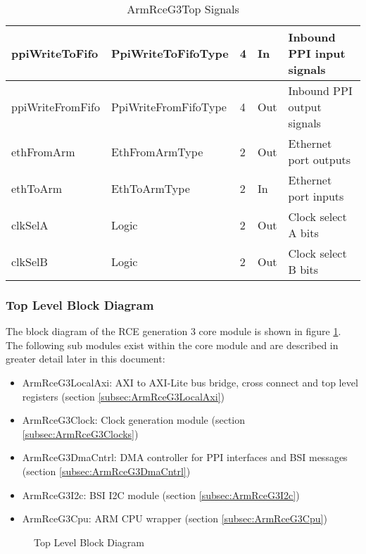 \documentclass[11pt]{article}
\begin{document}
\begin{table}[H]
\begin{tabular}{| l | l | l | l | l | }
      \hline ppiWriteToFifo     & PpiWriteToFifoType  & 4      & In        & Inbound PPI input signals \\
      \hline ppiWriteFromFifo   & PpiWriteFromFifoType  & 4      & Out       & Inbound PPI output signals \\
      \hline ethFromArm        & EthFromArmType     & 2      & Out       & Ethernet port outputs \\
      \hline ethToArm          & EthToArmType             & 2      & In        & Ethernet port inputs  \\
      \hline clkSelA           & Logic                                                    & 2      & Out       & Clock select A bits   \\
      \hline clkSelB           & Logic                                                    & 2      & Out       & Clock select B bits   \\
      \hline
   \end{tabular}
   \caption{ArmRceG3Top Signals}
   \label{tab:top_signals}
\end{table}

\subsubsection{Top Level Block Diagram}

The block diagram of the RCE generation 3 core module is shown in figure \ref{fig:top_level_block}. The following sub modules
exist within the core module and are described in greater detail later in this document:

\begin{itemize}
   \item ArmRceG3LocalAxi: AXI to AXI-Lite bus bridge, cross connect and top level registers (section \ref{subsec:ArmRceG3LocalAxi})
   \item ArmRceG3Clock: Clock generation module (section \ref{subsec:ArmRceG3Clocks})
   \item ArmRceG3DmaCntrl: DMA controller for PPI interfaces and BSI messages (section \ref{subsec:ArmRceG3DmaCntrl})
   \item ArmRceG3I2c: BSI I2C module (section \ref{subsec:ArmRceG3I2c})
   \item ArmRceG3Cpu: ARM CPU wrapper (section \ref{subsec:ArmRceG3Cpu})
\end{itemize}

\begin{figure}[H]
   \centering
   \caption{Top Level Block Diagram}
   \label{fig:top_level_block}
\end{figure}
\end{document}
